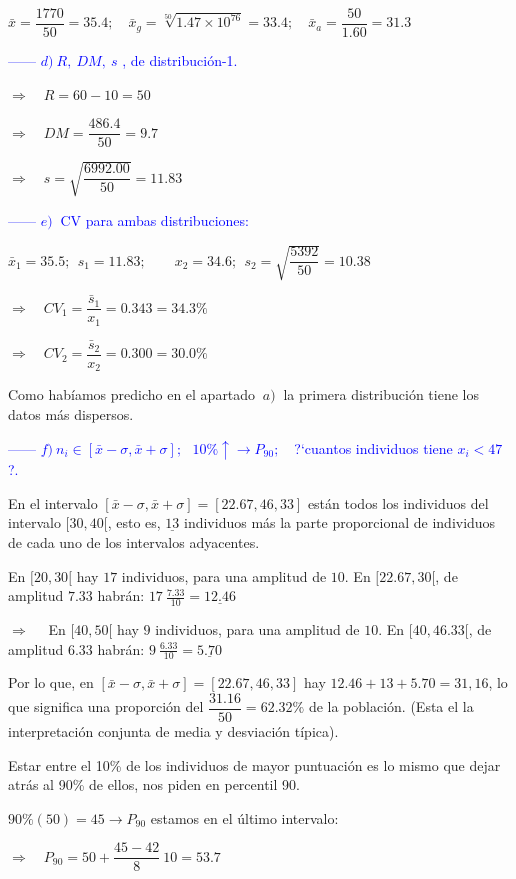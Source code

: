 $\bar x=\dfrac {1770}{50}=35.4;\quad \bar x_g=\sqrt[50]{1.47\times 10^{76}}=33.4;\quad \bar x_a =\dfrac{50}{1.60}=31.3$

\textcolor{blue}{------ $d)\ R,\ DM,\ s$ ,  de distribución-1.}

$\Rightarrow \quad R=60-10=50$

$\Rightarrow \quad DM=\dfrac{486.4}{50}=9.7$

$\Rightarrow \quad s=\sqrt{\dfrac{6992.00}{50}}=11.83$

\textcolor{blue}{------ $e)\ $ CV para ambas distribuciones:}

$\bar x_1=35.5;\ \ s_1=11.83; \qquad x_2=34.6; \ \ s_2=\sqrt{\dfrac{5392}{50}}=10.38$

$\Rightarrow \quad CV_1=\dfrac{\bar s_1}{x_1}=0.343=34.3\%$

$\Rightarrow \quad CV_2=\dfrac{\bar s_2}{x_2}=0.300=30.0\%$

Como habíamos predicho en el apartado $\ a)\ $ la primera distribución tiene los datos más dispersos.

\textcolor{blue}{------ $f)\ n_i \in [\bar x-\sigma, \bar x+\sigma];\ \ \ 10\% \uparrow \to P_90; \ \ \ $ ?`cuantos individuos tiene $x_i<47$?.} 

En el intervalo $ [\bar x-\sigma, \bar x+\sigma]=[22.67,46,33]$ están todos los individuos del intervalo $[30,40[$, esto es, $\underline {13}$ individuos más la parte proporcional de individuos de cada uno de los intervalos adyacentes. 

En $[20,30[$ hay $17$ individuos, para una amplitud de $10$. En $[22.67,30[$, de amplitud $7.33$ habrán:  $17\ \frac{7.33}{10}=\underline{12.46}$

$\Rightarrow \quad $ En $[40,50[$ hay $9$ individuos, para una amplitud de $10$. En $[40,46.33[$, de amplitud $6.33$ habrán:  $9\ \frac{6.33}{10}=\underline{5.70}$

Por lo que, en $ [\bar x-\sigma, \bar x+\sigma]=[22.67,46,33]$  hay $12.46+13+5.70=31,16$, lo que significa una proporción del $\dfrac{31.16}{50}=62.32\%$ de la población. \textcolor{gris}{(Esta el la interpretación conjunta de media y desviación típica).}

Estar entre el 10\% de los individuos de mayor puntuación es lo mismo que dejar atrás al 90\% de ellos, nos piden en percentil 90.

$90\%(50)=45 \to P_{90}$ estamos en el último intervalo:

$\Rightarrow \quad P_{90}= 50+\dfrac{45-42}{8}\ 10=53.7$

